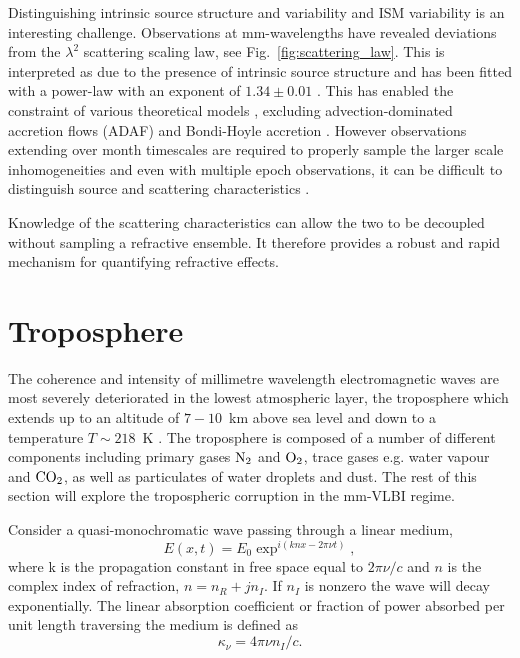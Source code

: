 Distinguishing intrinsic source structure and variability and ISM variability is an interesting challenge. Observations at mm-wavelengths have revealed deviations from the $\lambda^2$ scattering scaling law, see Fig.~\ref{fig:scattering_law}. This is interpreted as due to the presence of intrinsic source structure and has been fitted with a power-law with an exponent of $1.34 \pm 0.01$ \cite{Lu_2011}. This has enabled the constraint of various theoretical models \cite{Bower_2006}, excluding advection-dominated accretion flows (ADAF) \cite{Narayan_1998} and Bondi-Hoyle accretion \cite{Melia_1994}. However observations extending over month timescales are required to properly sample the larger scale inhomogeneities and even with multiple epoch observations, it can be difficult to distinguish source and scattering characteristics \citep*{Macquart_2006}.

Knowledge of the scattering characteristics can allow the two to be decoupled without sampling a refractive ensemble. It therefore provides
a robust and rapid mechanism for quantifying refractive effects.



\section{Troposphere}



The coherence and intensity of millimetre wavelength electromagnetic waves are most severely deteriorated in the lowest atmospheric layer, the troposphere which extends up to an altitude of $7-10$~km above sea level and down to a temperature $T \sim 218$~K \citep{Thompson_2001}. The troposphere is composed of a number of different components including primary gases $\rm N_2$ and  $\rm O_2$, trace gases e.g. water vapour and ${\rm CO_2}$, as well as particulates of water droplets and dust. The rest of this section will explore the tropospheric corruption in the mm-VLBI regime. 


Consider a quasi-monochromatic wave passing through a linear medium,
\begin{equation}
E(x,t) = E_0 \exp^{i(knx - 2\pi\nu t)},
\end{equation}		
where k is the propagation constant in free space equal to $2\pi \nu/c$ and $n$ is the complex index of refraction, $n= n_R + j n_I$. If $n_I$ is nonzero the wave will decay exponentially. The linear absorption coefficient or fraction of power absorbed per unit length traversing the medium is defined as 
\begin{equation}
\kappa_\nu = 4\pi \nu n_I/c.
\end{equation}


